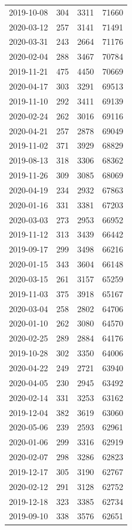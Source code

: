 \begin{tabular}{lrrr}
2019-10-08 & 304 & 3311 & 71660 \\
2020-03-12 & 257 & 3141 & 71491 \\
2020-03-31 & 243 & 2664 & 71176 \\
2020-02-04 & 288 & 3467 & 70784 \\
2019-11-21 & 475 & 4450 & 70669 \\
2020-04-17 & 303 & 3291 & 69513 \\
2019-11-10 & 292 & 3411 & 69139 \\
2020-02-24 & 262 & 3016 & 69116 \\
2020-04-21 & 257 & 2878 & 69049 \\
2019-11-02 & 371 & 3929 & 68829 \\
2019-08-13 & 318 & 3306 & 68362 \\
2019-11-26 & 309 & 3085 & 68069 \\
2020-04-19 & 234 & 2932 & 67863 \\
2020-01-16 & 331 & 3381 & 67203 \\
2020-03-03 & 273 & 2953 & 66952 \\
2019-11-12 & 313 & 3439 & 66442 \\
2019-09-17 & 299 & 3498 & 66216 \\
2020-01-15 & 343 & 3604 & 66148 \\
2020-03-15 & 261 & 3157 & 65259 \\
2019-11-03 & 375 & 3918 & 65167 \\
2020-03-04 & 258 & 2802 & 64706 \\
2020-01-10 & 262 & 3080 & 64570 \\
2020-02-25 & 289 & 2884 & 64176 \\
2019-10-28 & 302 & 3350 & 64006 \\
2020-04-22 & 249 & 2721 & 63940 \\
2020-04-05 & 230 & 2945 & 63492 \\
2020-02-14 & 331 & 3253 & 63162 \\
2019-12-04 & 382 & 3619 & 63060 \\
2020-05-06 & 239 & 2593 & 62961 \\
2020-01-06 & 299 & 3316 & 62919 \\
2020-02-07 & 298 & 3286 & 62823 \\
2019-12-17 & 305 & 3190 & 62767 \\
2020-02-12 & 291 & 3128 & 62752 \\
2019-12-18 & 323 & 3385 & 62734 \\
2019-09-10 & 338 & 3576 & 62651 \\

\end{tabular}
